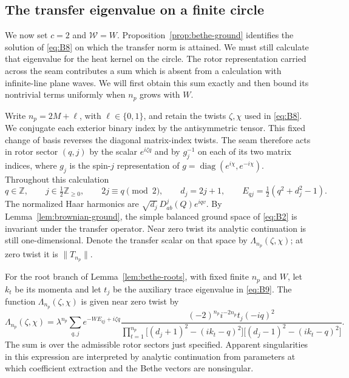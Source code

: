 \subsection{The transfer eigenvalue on a finite circle}
\label{subsec:bethe-transfer}

We now set $c=2$ and $\mathcal W=W$.  Proposition~\ref{prop:bethe-ground}
identifies the solution of \eqref{eq:B8} on which the transfer norm is
attained.  We must still calculate that eigenvalue for the heat kernel on
the circle.  The rotor representation carried across the seam contributes
a sum which is absent from a calculation with infinite-line plane waves.
We will first obtain this sum exactly and then bound its nontrivial terms
uniformly when $n_p$ grows with $W$.

Write $n_p=2M+\ell$, with $\ell\in\{0,1\}$, and retain the twists
$\zeta,\chi$ used in \eqref{eq:B8}.  We conjugate each exterior binary
index by the antisymmetric tensor.  This fixed change of basis reverses
the diagonal matrix-index twists.  The seam therefore acts in rotor
sector $(q,j)$ by the scalar $e^{i\zeta q}$ and by $g_j^{-1}$ on each of
its two matrix indices, where $g_j$ is the spin-$j$ representation of
$g=\operatorname{diag}(e^{i\chi},e^{-i\chi})$.  Throughout this calculation
\[
 q\in\mathbb Z,\qquad j\in\tfrac12\mathbb Z_{\ge0},\qquad
 2j\equiv q\pmod 2,\qquad d_j=2j+1,\qquad
 E_{qj}=\tfrac12(q^2+d_j^2-1).
\]
The normalized Haar harmonics are $\sqrt{d_j}\,D^j_{ab}(Q)e^{iqv}$.
By Lemma~\ref{lem:brownian-ground}, the simple balanced ground space of
\eqref{eq:B2} is invariant under the transfer operator.  Near zero twist
its analytic continuation is still one-dimensional.  Denote the transfer
scalar on that space by $\Lambda_{n_p}(\zeta,\chi)$; at zero twist it is
$\|T_{n_p}\|$.

\begin{lemma}
\label{lem:bethe-transfer-formula}
For the root branch of Lemma~\ref{lem:bethe-roots}, with fixed finite
$n_p$ and $W$, let $k_t$ be its momenta and let $t_j$ be the auxiliary
trace eigenvalue in \eqref{eq:B9}.  The function
$\Lambda_{n_p}(\zeta,\chi)$ is given near zero twist by
\begin{equation}
 \Lambda_{n_p}(\zeta,\chi)
 =\lambda^{n_p}\sum_{q,j}e^{-WE_{qj}+i\zeta q}
 \frac{(-2)^{n_p}i^{-2n_p}t_j(-iq)^2}
 {\displaystyle\prod_{t=1}^{n_p}
   \bigl[(d_j+1)^2-(ik_t-q)^2\bigr]
   \bigl[(d_j-1)^2-(ik_t-q)^2\bigr]} .
 \label{eq:B20}
\end{equation}
The sum is over the admissible rotor sectors just specified.  Apparent
singularities in this expression are interpreted by analytic
continuation from parameters at which coefficient extraction and the
Bethe vectors are nonsingular.
\end{lemma}

